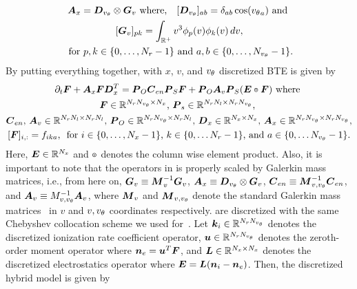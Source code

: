 \begin{multline}
	\vect{A}_x = \vect{D}_{\vtheta} \otimes \vect{G}_{v} \text{ where,}\quad
	[\vect D_\vtheta]_{ab} = \delta_{ab} \cos\of{\vtheta_a} \text{ and } \\ [\vect{G}_{v}]_{pk} =\int_{\reals^+} v^3 \phi_{p}\of{v} \phi_{k}\of{v}\diff{v}, \\
	\text{ for } p,k \in \{0,\hdots, N_r-1\} \text{ and } a, b \in \{0, \hdots, N_{\vtheta}-1\}
	\label{eq:A_x}.
\end{multline} By putting everything together, with $x$, $v$, and ${v_{\theta}}$ discretized BTE is given by
\begin{multline}
   \partial_t \vect F + \vect A_x \vect F \vect D_x^T = \vect P_{O}\vect C_{en} \vect P_{S} \vect{F} + \vect P_O \vect A_v \vect P_{S} \of{\vect E \pdot \vect{F}} \text{ where } \\
   \vect F \in \reals^{N_r N_\vtheta \times N_x}\text{, }\vect{P}_s
   \in \reals^{N_rN_l \times N_r N_\vtheta}\text{, }\\
   \vect{C}_{en}\text{, }\vect{A}_v \in \reals^{N_r N_l \times N_r N_l}\text{, }
   \vect{P}_O \in \reals^{N_r N_\vtheta \times N_r N_l}\text{, }
   \vect{D}_x \in \reals^{N_x \times N_x}\text{, }\vect{A}_x\in \reals^{N_rN_\vtheta \times N_r N_\vtheta}, \\
   [\vect F]_{i,:} = f_{ika}\text{, } 
   \text{ for } i \in \{0, \hdots ,N_x-1\} \text{, } k \in \{0, \hdots N_r-1\} \text{, and } a \in \{0, \hdots N_\vtheta-1\}    \label{eq:bte_1d_discrete}.
\end{multline} Here, $\boldsymbol{E} \in \mathbb{R}^{N_x}$ and $\pdot$ denotes the column wise element product. Also, it is important to note that the operators in  is properly scaled by Galerkin mass matrices, i.e., from here on, $\boldsymbol{G}_v \equiv \boldsymbol{M}^{-1}_v \boldsymbol{G}_v$, $\boldsymbol{A}_x \equiv \boldsymbol{D}_{v_{\theta}} \otimes \boldsymbol{G}_v$, $\boldsymbol{C}_{en} \equiv \boldsymbol{M}^{-1}_{v,{v_{\theta}}} \boldsymbol{C}_{en}$, and $\boldsymbol{A}_v \equiv M^{-1}_{v,{v_{\theta}}} \boldsymbol{A}_v$, where $\boldsymbol{M}_v$ and $\boldsymbol{M}_{v,{v_{\theta}}}$ denote the standard Galerkin mass matrices~\cite{ciarlet2002finite} in $v$ and $v, {v_{\theta}} $ coordinates respectively.   are discretized with the same Chebyshev collocation scheme we used for~. Let $\boldsymbol{k}_i\in \mathbb{R}^{N_r N_{v_{\theta}}}$ denotes the discretized ionization rate coefficient operator, $\boldsymbol{u}\in\mathbb{R}^{N_r N_{v_{\theta}}}$ denotes the zeroth-order moment operator where $\boldsymbol{n}_e = \boldsymbol{u}^T \boldsymbol{F}$, and $\boldsymbol{L}\in\mathbb{R}^{N_x \times N_x}$ denotes the discretized electrostatics operator where $\vect{E}=\vect{L}\of{\vect{n}_i-\vect{n}_e}$. Then, the discretized hybrid model is given by
